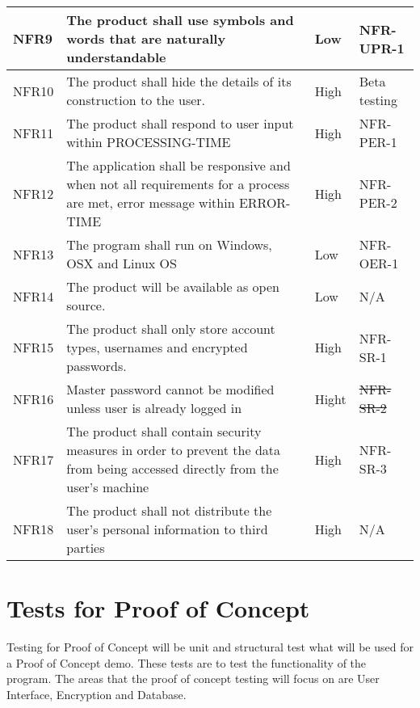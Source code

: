 \documentclass[12pt, titlepage]{article}
\begin{document}
\begin{table}[!htbp]
    \begin{tabularx}{\textwidth}{p{2cm}Xp{2cm}X}
        \midrule

        NFR9  & The product shall use symbols and words that are naturally understandable & Low & NFR-UPR-1\\\hline
        NFR10 & The product shall hide the details of its construction to the user. & High & Beta testing\\\hline
        NFR11 & The product shall respond to user input within PROCESSING-TIME & High & NFR-PER-1\\\hline
        NFR12 & The application shall be responsive and when not all requirements for a process are met, error message within ERROR-TIME & High & NFR-PER-2\\\hline
        NFR13 & The program shall run on Windows, OSX and Linux OS & Low & NFR-OER-1\\\hline
        NFR14 & The product will be available as open source. & Low & N/A\\\hline
        NFR15 & The product shall only store account types, usernames and encrypted passwords. & High & NFR-SR-1\\\hline
        NFR16 & Master password cannot be modified unless user is already logged in & Hight & \sout{NFR-SR-2}\\\hline
        NFR17 & The product shall contain security measures in order to prevent the data from being accessed directly from the user’s machine & High & NFR-SR-3\\\hline
        NFR18 & The product shall not distribute the user’s personal information to third parties & High & N/A\\

        \bottomrule

    \end{tabularx}
\end{table}

\section{Tests for Proof of Concept}

Testing for Proof of Concept will be unit and structural test what will be used for a Proof of Concept demo. These tests are to test the functionality of the program. The areas that the proof of concept testing will focus on are User Interface, Encryption and Database.
\end{document}
